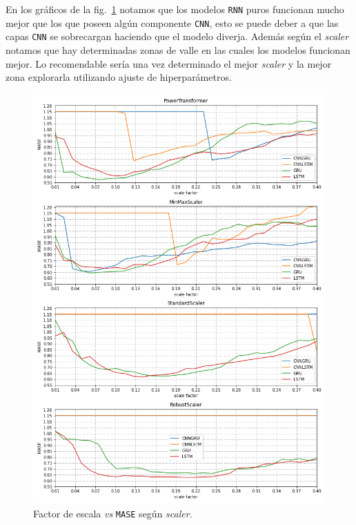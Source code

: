\documentclass[a4paper,12pt]{article}
\begin{document}
En los gráficos de la fig.~\ref{fig:scalers} notamos que los modelos \texttt{RNN} puros funcionan mucho mejor que los que poseen algún componente \texttt{CNN}, esto se puede deber a que las capas \texttt{CNN} se sobrecargan haciendo que el modelo diverja. Además según el \textit{scaler} notamos que hay determinadas zonas de valle en las cuales los modelos funcionan mejor. Lo recomendable sería una vez determinado el mejor \textit{scaler} y la mejor zona explorarla utilizando ajuste de hiperparámetros.

\begin{figure}[H]
	\begin{center}
	\includegraphics[width=1\textwidth]{scalers.png}
  	\caption{Factor de escala \textit{vs} \texttt{MASE} según \textit{scaler}.}
  	\label{fig:scalers}
  	\end{center}
\end{figure}
\end{document}
